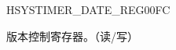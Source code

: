 \begin{register}{H}{SYSTIMER\_DATE\_REG}{\hexprefix{}00FC}\label{regdesc:SYSTIMERDATEREG}
%
\regnewline%
\begin{regdesc}\begin{reglist}
\label{fielddesc:SYSTIMERDATE}\item [SYSTIMER\_DATE] 版本控制寄存器。（读/写）
\end{reglist}\end{regdesc}
\end{register}



